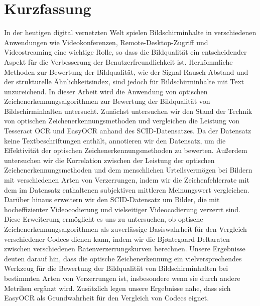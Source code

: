 \chapter{Kurzfassung}

In der heutigen digital vernetzten Welt spielen Bildschirminhalte in verschiedenen Anwendungen wie Videokonferenzen, Remote-Desktop-Zugriff und Videostreaming eine wichtige Rolle, so dass die Bildqualität ein entscheidender Aspekt für die Verbesserung der Benutzerfreundlichkeit ist.
Herkömmliche Methoden zur Bewertung der Bildqualität, wie der Signal-Rausch-Abstand und der strukturelle Ähnlichkeitsindex, sind jedoch für Bildschirminhalte mit Text unzureichend.
In dieser Arbeit wird die Anwendung von optischen Zeichenerkennungsalgorithmen zur Bewertung der Bildqualität von Bildschirminhalten untersucht.
Zunächst untersuchen wir den Stand der Technik von optischen Zeichenerkennungsmethoden und vergleichen die Leistung von Tesseract OCR und EasyOCR anhand des SCID-Datensatzes. 
Da der Datensatz keine Textbeschriftungen enthält, annotieren wir den Datensatz, um die Effektivität der optischen Zeichenerkennungsmethoden zu bewerten.
Außerdem untersuchen wir die Korrelation zwischen der Leistung der optischen Zeichenerkennungsmethoden und dem menschlichen Urteilsvermögen bei Bildern mit verschiedenen Arten von Verzerrungen, indem wir die Zeichenfehlerrate mit dem im Datensatz enthaltenen subjektiven mittleren Meinungswert vergleichen.
Darüber hinaus erweitern wir den SCID-Datensatz um Bilder, die mit hocheffizienter Videocodierung und vielseitiger Videocodierung verzerrt sind.
Diese Erweiterung ermöglicht es uns zu untersuchen, ob optische Zeichenerkennungsalgorithmen als zuverlässige Basiswahrheit für den Vergleich verschiedener Codecs dienen kann, indem wir die Bjøntegaard-Deltaraten zwischen verschiedenen Ratenverzerrungskurven berechnen.
Unsere Ergebnisse deuten darauf hin, dass die optische Zeichenerkennung ein vielversprechendes Werkzeug für die Bewertung der Bildqualität von Bildschirminhalten bei bestimmten Arten von Verzerrungen ist, insbesondere wenn sie durch andere Metriken ergänzt wird.
Zusätzlich legen unsere Ergebnisse nahe, dass sich EasyOCR als Grundwahrheit für den Vergleich von Codecs eignet.

